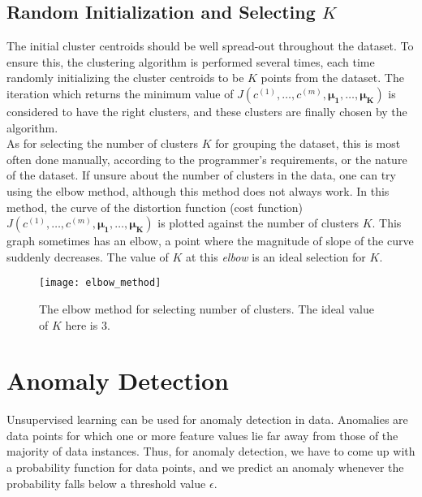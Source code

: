 \documentclass[a4paper, 12pt]{report}
\begin{document}
\section{Random Initialization and Selecting $K$}
The initial cluster centroids should be well spread-out throughout the dataset. To ensure this, the clustering algorithm is performed several times, each time randomly initializing the cluster centroids to be $K$ points from the dataset. The iteration which returns the minimum value of $J\left(c^{\left(1\right)}, \dots, c^{\left(m\right)}, \bm{\mu_1}, \dots, \bm{\mu_K}\right)$ is considered to have the right clusters, and these clusters are finally chosen by the algorithm. \\
\break
As for selecting the number of clusters $K$ for grouping the dataset, this is most often done manually, according to the programmer's requirements, or the nature of the dataset. If unsure about the number of clusters in the data, one can try using the elbow method, although this method does not always work. In this method, the curve of the distortion function (cost function) $J\left(c^{\left(1\right)}, \dots, c^{\left(m\right)}, \bm{\mu_1}, \dots, \bm{\mu_K}\right)$ is plotted against the number of clusters $K$. This graph sometimes has an elbow, a point where the magnitude of slope of the curve suddenly decreases. The value of $K$ at this \textit{elbow} is an ideal selection for $K$.
\begin{figure}[H]
\centering
\texttt{[image: elbow\_method]}
\caption{The elbow method for selecting number of clusters. The ideal value of $K$ here is $3$.}
\end{figure}

\chapter{Anomaly Detection}
Unsupervised learning can be used for anomaly detection in data. Anomalies are data points for which one or more feature values lie far away from those of the majority of data instances. Thus, for anomaly detection, we have to come up with a probability function for data points, and we predict an anomaly whenever the probability falls below a threshold value $\epsilon$. 
\end{document}
